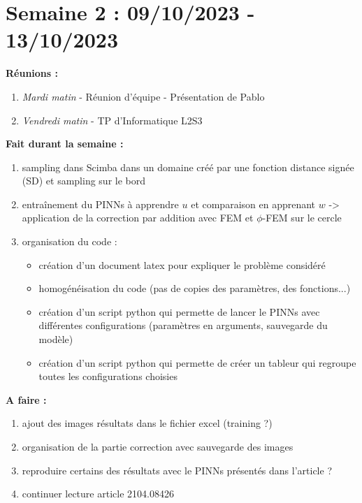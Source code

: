 \documentclass[french]{article}
\begin{document}
\section{Semaine 2 : 09/10/2023 - 13/10/2023}
	\textbf{Réunions :}
	\begin{enumerate}[label=\textbullet]
		\item \textit{Mardi matin} -  Réunion d'équipe - Présentation de Pablo
		\item \textit{Vendredi matin} - TP d'Informatique L2S3
	\end{enumerate}
	\textbf{Fait durant la semaine :}
	\begin{enumerate}[label=\textbullet]
		\item sampling dans Scimba dans un domaine créé par une fonction distance signée (SD) et sampling sur le bord
		\item entraînement du PINNs à apprendre $u$ et comparaison en apprenant $w$ -> application de la correction par addition avec FEM et $\phi$-FEM sur le cercle
		\item organisation du code :
		\begin{itemize}
			\item création d'un document latex pour expliquer le problème considéré
			\item homogénéisation du code (pas de copies des paramètres, des fonctions...)
			\item création d'un script python qui permette de lancer le PINNs avec différentes configurations (paramètres en arguments, sauvegarde du modèle)
			\item création d'un script python qui permette de créer un tableur qui regroupe toutes les configurations choisies
		\end{itemize} 
	\end{enumerate}
	
	\textbf{A faire :}
	\begin{enumerate}[label=\textbullet]
		\item ajout des images résultats dans le fichier excel (training ?)
		\item organisation de la partie correction avec sauvegarde des images
		\item reproduire certains des résultats avec le PINNs présentés dans l'article ?
		\item continuer lecture article 2104.08426
	\end{enumerate}
\end{document}
